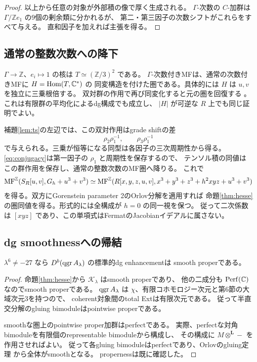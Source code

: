 \begin{proof}
以上から任意の対象が外部積の像で厚く生成される。
$\Gamma$-次数の $C$-加群は $\Gamma/\mathbb Ze_1$ の9個の剰余類に分かれるが、
第二・第三因子の次数シフトがこれらをすべて与える。
直和因子を加えれば主張を得る。
\end{proof}

\subsection{通常の整数次数への降下}

$\Gamma\to\mathbb Z$、$e_i\mapsto1$ の核は
$T\simeq(\mathbb Z/3)^2$ である。
$\Gamma$-次数付きMFは、通常の次数付きMFに $H=\operatorname{Hom}(T,\mathbb C^*)$ の
同変構造を付けた圏である。具体的には $H$ は $u,v$ を独立に三乗根倍する。
双対群の作用で再び同変化すると元の圏を回復する
\cite[Theorem 4.2]{Elagin}。これは有限群の平均化によるdg構成でも成立し、
$|H|$ が可逆な $R$ 上でも同じ証明でよい。

補題\ref{lem:ts}の左辺では、この双対作用はgrade shiftの差
\[
 \rho_2\rho_1^{-1},\qquad\rho_3\rho_1^{-1}
\]
で与えられる。三乗が恒等になる同型は各因子の三次周期性から得る。
\eqref{eq:conjugacy}は第一因子の $\rho_1$ と周期性を保存するので、
テンソル積の同値はこの群作用を保存し、通常の整数次数のMF圏へ降りる。
これで
\[
 \operatorname{MF}^{\mathbb Z}(S_R[u,v],G_h+u^3+v^3)
 \simeq
 \operatorname{MF}^{\mathbb Z}(R[x,y,z,u,v],x^3+y^3+z^3+h^2xyz+u^3+v^3)
\]
を得る。双方にGorenstein parameter 2のOrlov分解を適用すれば
命題\ref{thm:hesse}の圏同値を得る。形式的には全構成が $h=0$ の同一視を保つ。
従って二次係数は $[xyz]$ であり、この単項式はFermatのJacobianイデアルに属さない。

\subsection{dg smoothnessへの帰結}

\begin{theorem}\label{thm:dg-smooth}
$\lambda^6\ne-27$ なら $D^b(\operatorname{qgr} A_\lambda)$ の標準的dg enhancementは
smooth properである。
\end{theorem}
\begin{proof}
命題\ref{thm:hesse}から $\mathcal K_\lambda$ はsmooth properであり、
他の二成分も $\operatorname{Perf}(\mathbb C)$ なのでsmooth properである。
$\operatorname{qgr} A_\lambda$ は $\chi$、有限コホモロジー次元と第6節の大域次元3を持つので、
coherent対象間のtotal Extは有限次元である。
従って半直交分解のgluing bimoduleはpointwise properである。

smoothな圏上のpointwise proper加群はperfectである。
実際、perfectな対角bimoduleを有限個のrepresentable bimoduleから構成し、
その構成に $M\otimes^{\mathbf L}-$ を作用させればよい。
従って各gluing bimoduleはperfectであり、Orlovのgluing定理
\cite[Proposition 3.8, Theorem 3.25]{OrlovGlue}から全体がsmoothとなる。
propernessは既に確認した。
\end{proof}

